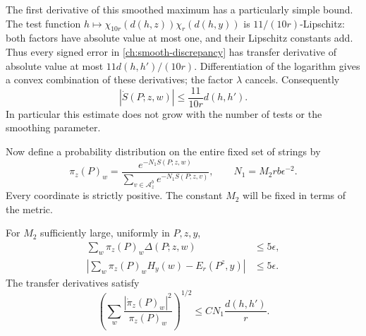 The first derivative of this smoothed maximum has a particularly simple
bound.  The test function
$h\mapsto\chi_{10r}(d(h,z))\chi_r(d(h,y))$ is
$11/(10r)$-Lipschitz: both factors have absolute value at most one, and
their Lipschitz constants add.  Thus every signed error in
\eqref{ch:smooth-discrepancy} has transfer derivative of absolute value
at most $11d(h,h')/(10r)$.  Differentiation of the logarithm gives a convex
combination of these derivatives; the factor $\lambda$ cancels.
Consequently
\begin{equation}
 |\dot S(P;z,w)|\le\frac{11}{10r}d(h,h').
 \label{ch:smooth-discrepancy-derivative}
\end{equation}
In particular this estimate does not grow with the number of tests or the
smoothing parameter.

Now define a probability distribution on the entire fixed set of strings by
\begin{equation}
 \pi_z(P)_w
 =\frac{e^{-N_1S(P;z,w)}}{\sum_{v\in\mathcal A_z^b}e^{-N_1S(P;z,v)}},
 \qquad N_1=M_2rb\epsilon^{-2}.
 \label{ch:gibbs-strings}
\end{equation}
Every coordinate is strictly positive.  The constant $M_2$ will be fixed
in terms of the metric.

\begin{lemma}
\label{ch:string-estimates}
For $M_2$ sufficiently large, uniformly in $P,z,y$,
\begin{align}
 \sum_w\pi_z(P)_w\Delta(P;z,w)&\le5\epsilon,
       \label{ch:mean-discrepancy}\\
 \left|\sum_w\pi_z(P)_wH_y(w)-E_r(P^z,y)\right|
       &\le5\epsilon.
       \label{ch:mean-score}
\end{align}
The transfer derivatives satisfy
\begin{equation}
 \left(\sum_w\frac{|\dot\pi_z(P)_w|^2}{\pi_z(P)_w}\right)^{1/2}
       \le C N_1\frac{d(h,h')}{r}.
 \label{ch:string-fisher}
\end{equation}
\end{lemma}

